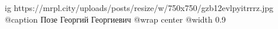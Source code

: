  
 
 
 
 

\ifcmt
  ig https://mrpl.city/uploads/posts/resize/w/750x750/gzb12evlpyitrrrz.jpg
	@caption Позе Георгий Георгиевич
  @wrap center
  @width 0.9
\fi

